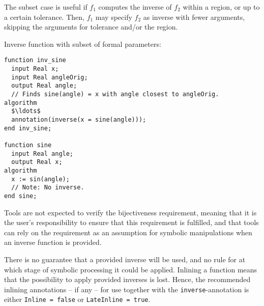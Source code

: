The subset case is useful if $f_1$ computes the inverse of $f_2$ within a region, or up to a certain tolerance.
Then, $f_1$ may specify $f_2$ as inverse with fewer arguments, skipping the arguments for tolerance and/or the region.

\begin{example}
Inverse function with subset of formal parameters:
\begin{lstlisting}[language=modelica]
function inv_sine
  input Real x;
  input Real angleOrig;
  output Real angle;
  // Finds sine(angle) = x with angle closest to angleOrig.
algorithm
  $\ldots$
  annotation(inverse(x = sine(angle)));
end inv_sine;

function sine
  input Real angle;
  output Real x;
algorithm
  x := sin(angle);
  // Note: No inverse.
end sine;
\end{lstlisting}
\end{example}

Tools are not expected to verify the bijectiveness requirement, meaning that it is the user's responsibility to ensure that this requirement is fulfilled, and that tools can rely on the requirement as an assumption for symbolic manipulations when an inverse function is provided.

There is no guarantee that a provided inverse will be used, and no rule for at which stage of symbolic processing it could be applied.
Inlining a function means that the possibility to apply provided inverses is lost.
Hence, the recommended inlining annotations -- if any -- for use together with the {\lstinline!inverse!}-annotation is either {\lstinline!Inline = false!} or {\lstinline!LateInline = true!}.

